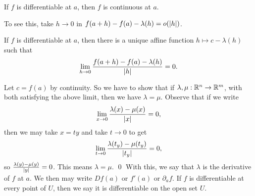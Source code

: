 \begin{simplelemma}
    If $f $ is differentiable at $a$, then $f$ is continuous at $a$.
\end{simplelemma}
\noindent To see this, take $h \to 0$ in $f(a + h) - f(a) - \lambda(h) = o(\left\lvert h \right\rvert)$.
\begin{simplelemma}
    If $f$ is differentiable at $a$, then there is a unique affine function $h \mapsto c - \lambda(h)$ such that
    \[ \lim_{h \to 0} \frac{f(a + h) - f(a) - \lambda(h)}{\left\lvert h \right\rvert} = 0. \] 
\end{simplelemma}
\noindent Let $c = f(a)$ by continuity. So we have to show that if $\lambda, \mu : \mathbb R^n \to \mathbb R^m$, with both satisfying the above limit, then we have $\lambda = \mu$. Observe that if we write
\[ \lim_{x \to 0} \frac{\lambda(x) - \mu(x)}{\left\lvert x \right\rvert} = 0, \]
then we may take $x = ty$ and take $t \to 0$ to get
\[ \lim_{t \to 0} \frac{\lambda(t_y) - \mu(t_y)}{\left\lvert t_y \right\rvert} = 0, \]
so $\frac{\lambda(y) - \mu(y)}{\left\lvert y \right\rvert} = 0$. This means $\lambda = \mu$. \qed
\medskip\newline
\noindent With this, we say that $\lambda$ is the derivative of $f$ at $a$. We then may write $Df(a)$ or $f'(a)$ or $\partial_a f$. If $f$ is differentiable at every point of $U$, then we say it is differentiable on the open set $U$.